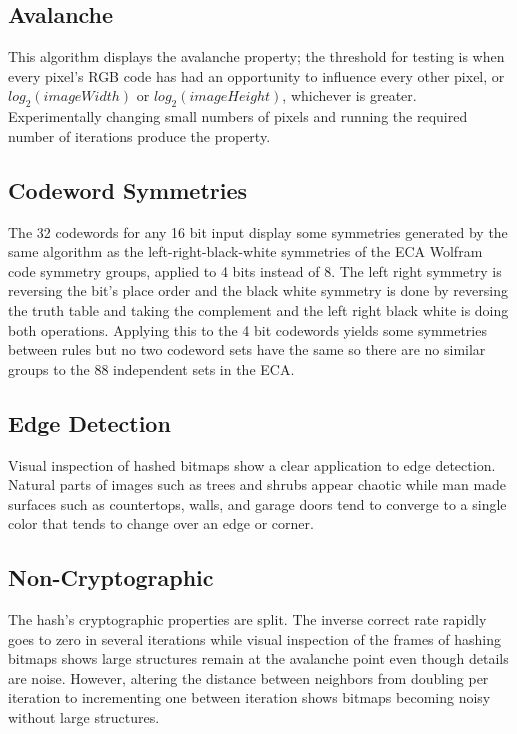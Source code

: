 \documentclass[11pt]{article}
\begin{document}
\subsection{Avalanche}
This algorithm displays the avalanche property; the threshold for testing is when every pixel's RGB code has had an opportunity to influence every other pixel, or $log_2(imageWidth)$ or $log_2(imageHeight)$, whichever is greater. Experimentally changing small numbers of pixels and running the required number of iterations produce the property. \\

\subsection{Codeword Symmetries}
The 32 codewords for any 16 bit input display some symmetries generated by the same algorithm as the left-right-black-white symmetries of the ECA Wolfram code symmetry groups, applied to 4 bits instead of 8. The left right symmetry is reversing the bit's place order and the black white symmetry is done by reversing the truth table and taking the complement and the left right black white is doing both operations. Applying this to the 4 bit codewords yields some symmetries between rules but no two codeword sets have the same so there are no similar groups to the 88 independent sets in the ECA.\cite{Wolfram}\\

\subsection{Edge Detection}
Visual inspection of hashed bitmaps show a clear application to edge detection. Natural parts of images such as trees and shrubs appear chaotic while man made surfaces such as countertops, walls, and garage doors tend to converge to a single color that tends to change over an edge or corner.\\

\subsection{Non-Cryptographic}
The hash's cryptographic properties are split. The inverse correct rate rapidly goes to zero in several iterations while visual inspection of the frames of hashing bitmaps shows large structures remain at the avalanche point even though details are noise. However, altering the distance between neighbors from doubling per iteration to incrementing one between iteration shows bitmaps becoming noisy without large structures.\\
\end{document}
